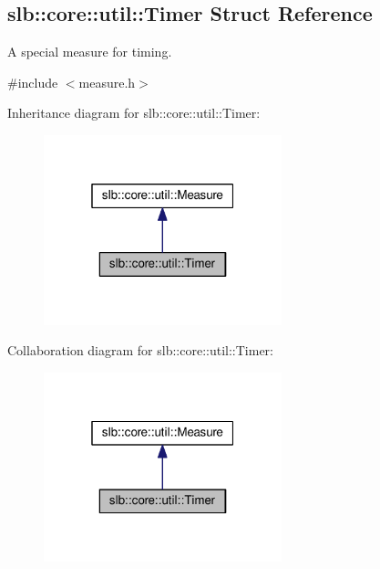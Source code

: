 \hypertarget{structslb_1_1core_1_1util_1_1Timer}{}\subsection{slb\+:\+:core\+:\+:util\+:\+:Timer Struct Reference}
\label{structslb_1_1core_1_1util_1_1Timer}


A special measure for timing.  




{\ttfamily \#include $<$measure.\+h$>$}



Inheritance diagram for slb\+:\+:core\+:\+:util\+:\+:Timer\+:\nopagebreak
\begin{figure}[H]
\begin{center}
\leavevmode
\includegraphics[width=196pt]{structslb_1_1core_1_1util_1_1Timer__inherit__graph}
\end{center}
\end{figure}


Collaboration diagram for slb\+:\+:core\+:\+:util\+:\+:Timer\+:\nopagebreak
\begin{figure}[H]
\begin{center}
\leavevmode
\includegraphics[width=196pt]{structslb_1_1core_1_1util_1_1Timer__coll__graph}
\end{center}
\end{figure}
